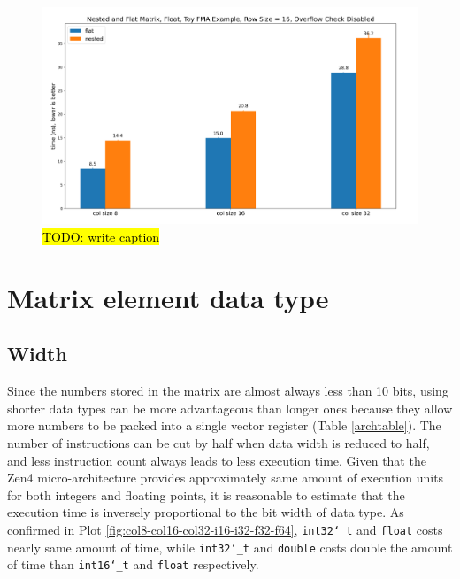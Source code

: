 \documentclass[logo,bsc,singlespacing,parskip]{infthesis}
\newcommand{\dtshort}{\texttt{int16\char`_t}}
\newcommand{\dtint}{\texttt{int32\char`_t}}
\newcommand{\dtfloat}{\texttt{float}}
\newcommand{\dtdouble}{\texttt{double}}
\begin{document}
\begin{figure}
    \includegraphics[width=\linewidth]{image/nested-flat.jpg}
    \caption{\hl{TODO: write caption}}
    \label{fig:nested-flat}
\end{figure}


\section{Matrix element data type}


\subsection{Width}
\label{sec:width} 
Since the numbers stored in the matrix are almost always less than 10 bits,
using shorter data types can be more advantageous than longer ones because they
allow more numbers to be packed into a single vector register (Table
\ref{archtable}). The number of instructions can be cut by half when data width
is reduced to half, and less instruction count always leads to less execution
time. Given that the Zen4 micro-architecture provides approximately same amount
of execution units for both integers and floating points, it is reasonable to
estimate that the execution time is inversely proportional to the bit width of
data type. As confirmed in Plot \ref{fig:col8-col16-col32-i16-i32-f32-f64},
\dtint{} and \dtfloat{} costs nearly same amount of time, while \dtint{} and \dtdouble{}
costs double the amount of time than \dtshort{} and \dtfloat{} respectively.
\end{document}

